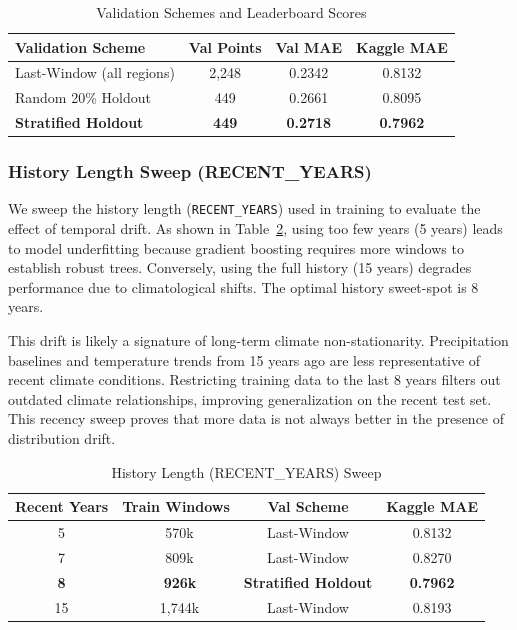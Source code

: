 \documentclass[conference]{IEEEtran}
\begin{document}
\begin{table}[htbp]
\caption{Validation Schemes and Leaderboard Scores}
\begin{center}
\begin{tabular}{lccc}
\toprule
\textbf{Validation Scheme} & \textbf{Val Points} & \textbf{Val MAE} & \textbf{Kaggle MAE} \\
\midrule
Last-Window (all regions)  & 2,248 & 0.2342 & 0.8132 \\
Random 20\% Holdout        & 449   & 0.2661 & 0.8095 \\
\textbf{Stratified Holdout} & \textbf{449} & \textbf{0.2718} & \textbf{0.7962} \\
\bottomrule
\end{tabular}
\label{tab:val_schemes}
\end{center}
\end{table}

\subsubsection{History Length Sweep (RECENT\_YEARS)}
We sweep the history length (\texttt{RECENT\_YEARS}) used in training to evaluate the effect of temporal drift. As shown in Table~\ref{tab:recent_years}, using too few years (5 years) leads to model underfitting because gradient boosting requires more windows to establish robust trees. Conversely, using the full history (15 years) degrades performance due to climatological shifts. The optimal history sweet-spot is 8 years.

This drift is likely a signature of long-term climate non-stationarity. Precipitation baselines and temperature trends from 15 years ago are less representative of recent climate conditions. Restricting training data to the last 8 years filters out outdated climate relationships, improving generalization on the recent test set. This recency sweep proves that more data is not always better in the presence of distribution drift.

\begin{table}[htbp]
\caption{History Length (RECENT\_YEARS) Sweep}
\begin{center}
\begin{tabular}{cccc}
\toprule
\textbf{Recent Years} & \textbf{Train Windows} & \textbf{Val Scheme} & \textbf{Kaggle MAE} \\
\midrule
5  & ~570k & Last-Window & 0.8132 \\
7  & ~809k & Last-Window & 0.8270 \\
\textbf{8}  & \textbf{~926k} & \textbf{Stratified Holdout} & \textbf{0.7962} \\
15 & ~1,744k & Last-Window & 0.8193 \\
\bottomrule
\end{tabular}
\label{tab:recent_years}
\end{center}
\end{table}
\end{document}
